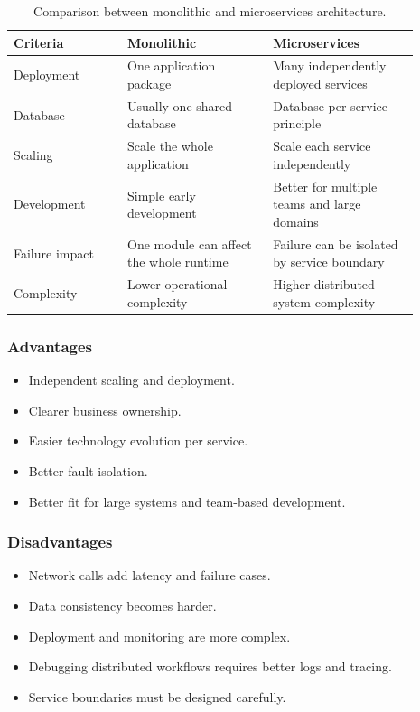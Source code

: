\documentclass[12pt,a4paper]{article}
\begin{document}
\begin{table}[H]
\centering
\caption{Comparison between monolithic and microservices architecture.}
\label{tab:mono-vs-micro}
\begin{tabular}{p{0.25\linewidth}p{0.32\linewidth}p{0.32\linewidth}}
\toprule
\textbf{Criteria} & \textbf{Monolithic} & \textbf{Microservices}\\
\midrule
Deployment & One application package & Many independently deployed services\\
Database & Usually one shared database & Database-per-service principle\\
Scaling & Scale the whole application & Scale each service independently\\
Development & Simple early development & Better for multiple teams and large domains\\
Failure impact & One module can affect the whole runtime & Failure can be isolated by service boundary\\
Complexity & Lower operational complexity & Higher distributed-system complexity\\
\bottomrule
\end{tabular}
\end{table}

\subsubsection{Advantages}

\begin{itemize}
    \item Independent scaling and deployment.
    \item Clearer business ownership.
    \item Easier technology evolution per service.
    \item Better fault isolation.
    \item Better fit for large systems and team-based development.
\end{itemize}

\subsubsection{Disadvantages}

\begin{itemize}
    \item Network calls add latency and failure cases.
    \item Data consistency becomes harder.
    \item Deployment and monitoring are more complex.
    \item Debugging distributed workflows requires better logs and tracing.
    \item Service boundaries must be designed carefully.
\end{itemize}
\end{document}
